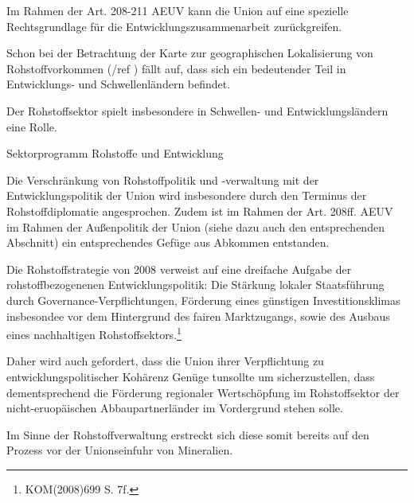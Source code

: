 \documentclass[12pt,a4paper,oneside]{book} %
\begin{document}
{	Im Rahmen der Art. 208-211 AEUV kann die Union auf eine spezielle Rechtsgrundlage für die Entwicklungszusammenarbeit zurückgreifen.
	
	Schon bei der Betrachtung der Karte zur geographischen Lokalisierung von Rohstoffvorkommen (/ref ) fällt auf, dass sich ein bedeutender Teil in Entwicklungs- und Schwellenländern befindet.
	
	Der Rohstoffsektor spielt insbesondere in Schwellen- und Entwicklungsländern eine Rolle.
	
	Sektorprogramm Rohstoffe und Entwicklung
	
	Die Verschränkung von Rohstoffpolitik und -verwaltung mit der Entwicklungspolitik der Union wird insbesondere durch den Terminus der Rohstoffdiplomatie angesprochen. Zudem ist im Rahmen der Art. 208ff. AEUV im Rahmen der Außenpolitik der Union (siehe dazu auch den entsprechenden Abschnitt) ein entsprechendes Gefüge aus Abkommen entstanden.
	
	Die Rohstoffstrategie von 2008 verweist auf eine dreifache Aufgabe der rohstoffbezogenenen Entwicklungspolitik: Die Stärkung lokaler Staatsführung durch Governance-Verpflichtungen, Förderung eines günstigen Investitionsklimas insbesondee vor dem Hintergrund des fairen Marktzugangs, sowie des Ausbaus eines nachhaltigen Rohstoffsektors.\footnote{KOM(2008)699 S. 7f.}
	
	Daher wird auch gefordert, dass die Union \glqq ihrer Verpflichtung zu entwicklungspolitischer Kohärenz Genüge tun\grqq sollte um sicherzustellen, dass dementsprechend die Förderung regionaler Wertschöpfung im Rohstoffsektor der nicht-eruopäischen Abbaupartnerländer im Vordergrund stehen solle.\autocite[15]{Kueblboeck_2023}
	
	Im Sinne der Rohstoffverwaltung erstreckt sich diese somit bereits auf den Prozess vor der Unionseinfuhr von Mineralien.
	

	
	
}
\end{document}
